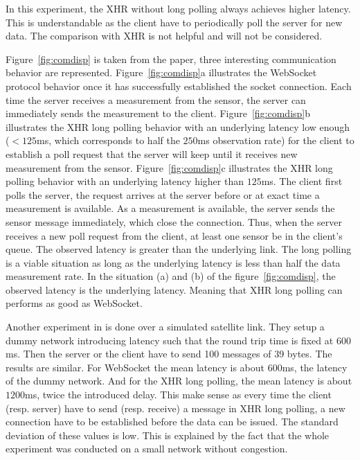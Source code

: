 \documentclass[10pt,journal,compsoc]{IEEEtran}
\newcommand{\ws}{WebSocket}
\begin{document}
In this experiment, the XHR without long polling always achieves higher latency.
This is understandable as the client have to periodically poll the server for new data.
The comparison with XHR is not helpful and will not be considered.

Figure~\ref{fig:comdisp} is taken from the paper, three interesting communication behavior are represented.
Figure~\ref{fig:comdisp}a illustrates the \ws{} protocol behavior once it has successfully established the socket connection. Each time the server receives a measurement from the sensor, the server can immediately sends the measurement to the client.
Figure~\ref{fig:comdisp}b illustrates the XHR long polling behavior with an underlying latency low enough ($< 125 $ms, which corresponds to half the $250$ms observation rate) for the client to establish a poll request that the server will keep until it receives new measurement from the sensor.
Figure~\ref{fig:comdisp}c illustrates the XHR long polling behavior with an underlying latency higher than $125$ms.
The client first polls the server, the request arrives at the server before or at exact time a measurement is available.
As a measurement is available, the server sends the sensor message immediately, which close the connection.
Thus, when the server receives a new poll request from the client, at least one sensor be in the client's queue.
The observed latency is greater than the underlying link.
The long polling is a viable situation as long as the underlying latency is less than half the data measurement rate.
In the situation (a) and (b) of the figure~\ref{fig:comdisp}, the observed latency is the underlying latency.
Meaning that XHR long polling can performs as good as \ws{}.



Another experiment in \cite{collinalatency} is done over a simulated satellite link. They setup a dummy network introducing latency such that the round trip time is fixed at $600$ms. 
Then the server or the client have to send 100 messages of 39 bytes. The results are similar. 
For \ws{} the mean latency is about $600$ms, the latency of the dummy network. And for the XHR long polling, the mean latency is about $1200$ms, twice the introduced delay. 
This make sense as every time the client (resp. server) have to send (resp. receive) a message in XHR long polling, a new connection have to be established before the data can be issued. 
The standard deviation of these values is low. 
This is explained by the fact that the whole experiment was conducted on a small network without congestion.
\end{document}
